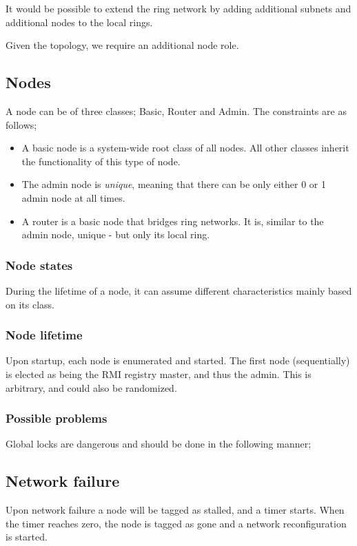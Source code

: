 \documentclass[10pt,a4paper]{article}
\begin{document}
It would be possible to extend the ring network by adding additional subnets and additional nodes to the local rings.

Given the topology, we require an additional node role.

\subsection{Nodes}
A node can be of three classes; Basic, Router and Admin. The constraints are as follows;
\begin{itemize}
\item A basic node is a system-wide root class of all nodes. All other classes inherit the functionality of this type of node.
\item The admin node is \emph{unique}, meaning that there can be only either 0 or 1 admin node at all times.
\item A router is a basic node that bridges ring networks. It is, similar to the admin node, unique - but only its local ring.
\end{itemize}


\subsubsection{Node states}
During the lifetime of a node, it can assume different characteristics mainly based on its class.

\subsubsection{Node lifetime}
Upon startup, each node is enumerated and started. The first node (sequentially) is elected as being the RMI registry master, and thus the admin. This is arbitrary, and could also be randomized.

\subsubsection{Possible problems}
Global locks are dangerous and should be done in the following manner; 

\subsection{Network failure}

Upon network failure a node will be tagged as stalled, and a timer starts. When the timer reaches zero, the node is tagged as gone and a network reconfiguration is started.
\end{document}

